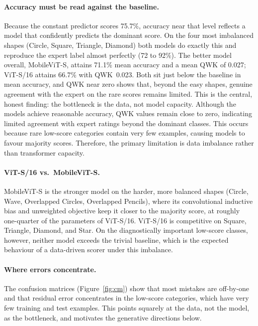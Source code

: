 \documentclass[10pt,twocolumn,letterpaper]{article}
\newcommand{\BaselineMeanAcc}{75.7}
\newcommand{\BestModel}{MobileViT-S}
\newcommand{\BestMeanAcc}{71.1}
\newcommand{\BestMeanQWK}{0.027}
\newcommand{\ViTMeanAcc}{66.7}
\newcommand{\ViTMeanQWK}{0.023}
\begin{document}
\paragraph{Accuracy must be read against the baseline.}
Because the constant predictor scores \BaselineMeanAcc\%, accuracy near that
level reflects a model that confidently predicts the dominant score. On the
four most imbalanced shapes (Circle, Square, Triangle, Diamond) both models do
exactly this and reproduce the expert label almost perfectly (72 to 92\%). The
better model overall, \BestModel, attains \BestMeanAcc\% mean accuracy and a
mean QWK of \BestMeanQWK; ViT-S/16 attains \ViTMeanAcc\% with QWK~\ViTMeanQWK.
Both sit just below the baseline in mean accuracy, and QWK near zero shows
that, beyond the easy shapes, genuine agreement with the expert on the rare
scores remains limited. This is the central, honest finding: the bottleneck is
the data, not model capacity. Although the models achieve reasonable accuracy,
QWK values remain close to zero, indicating limited agreement with expert
ratings beyond the dominant classes. This occurs because rare low-score
categories contain very few examples, causing models to favour majority
scores. Therefore, the primary limitation is data imbalance rather than
transformer capacity.

\paragraph{ViT-S/16 vs.\ MobileViT-S.}
MobileViT-S is the stronger model on the harder, more balanced shapes (Circle,
Wave, Overlapped Circles, Overlapped Pencils), where its convolutional
inductive bias and unweighted objective keep it closer to the majority score,
at roughly one-quarter of the parameters of ViT-S/16. ViT-S/16 is competitive
on Square, Triangle, Diamond, and Star. On the diagnostically important
low-score classes, however, neither model exceeds the trivial baseline, which
is the expected behaviour of a data-driven scorer under this imbalance.

\paragraph{Where errors concentrate.}
The confusion matrices (Figure~\ref{fig:cm}) show that most mistakes are
off-by-one and that residual error concentrates in the low-score categories,
which have very few training and test examples. This points squarely at the
data, not the model, as the bottleneck, and motivates the generative
directions below.
\end{document}
